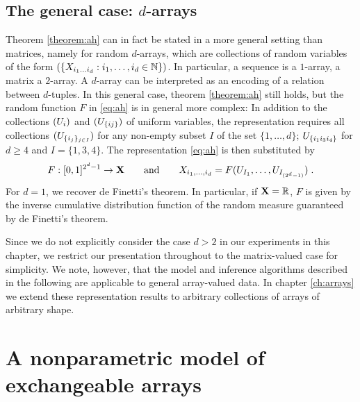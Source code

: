 \subsection{The general case: $d$-arrays}

Theorem \ref{theorem:ah} can in fact be stated in a more general setting than matrices, namely for random $d$-arrays, which are collections
of random variables of the form $(\{X_{i_1\dots i_d} : i_1,\dots,i_d\in\mathbb{N}\})$.
In particular, a sequence is a $1$-array, a matrix a $2$-array. A $d$-array 
can be interpreted as an encoding of a relation between $d$-tuples.
In this general case, theorem \ref{theorem:ah} still holds, but the random function $F$ in \eqref{eq:ah} is in general more complex:
In addition to the collections $(U_{i})$ and $(U_{\lbrace ij\rbrace})$ of uniform variables, the representation requires all
collections $(U_{\lbrace i_j\rbrace_{j\in I}})$ for any non-empty subset $I$ of the set $\lbrace 1,\ldots,d\rbrace$; \eg
$U_{\{i_1 i_3 i_4\}}$ for $d\geq 4$ and ${I=\lbrace 1,3,4\rbrace}$. The representation \eqref{eq:ah} is then substituted by
\begin{equation}
  F:[0,1]^{2^d-1}\to\mathbf{X}\qquad\text{and}\qquad X_{i_1,\dots,i_d}=F(U_{I_1},\dots,U_{I_{(2^d-1)}})\;.
\end{equation}
For $d=1$, we recover de Finetti's theorem. In particular, if $\mathbf{X}=\mathbb{R}$, $F$ is given by the inverse cumulative distribution function
of the random measure guaranteed by de Finetti's theorem.

Since we do not explicitly consider the case $d>2$ in our experiments in this chapter, we restrict 
our presentation throughout to the matrix-valued case for simplicity.
We note, however, that the model and inference algorithms described in the following are applicable to general array-valued data.
In chapter \ref{ch:arrays} we extend these representation results to arbitrary collections of arrays of arbitrary shape.

\section{A nonparametric model of exchangeable arrays}
\label{sec:networks:model}

